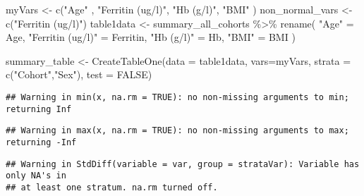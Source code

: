 \documentclass[
]{article}
\newenvironment{Shaded}{\begin{snugshade}}{\end{snugshade}}
\newcommand{\AttributeTok}[1]{\textcolor[rgb]{0.77,0.63,0.00}{#1}}
\newcommand{\ConstantTok}[1]{\textcolor[rgb]{0.00,0.00,0.00}{#1}}
\newcommand{\FunctionTok}[1]{\textcolor[rgb]{0.00,0.00,0.00}{#1}}
\newcommand{\NormalTok}[1]{#1}
\newcommand{\OtherTok}[1]{\textcolor[rgb]{0.56,0.35,0.01}{#1}}
\newcommand{\SpecialCharTok}[1]{\textcolor[rgb]{0.00,0.00,0.00}{#1}}
\newcommand{\StringTok}[1]{\textcolor[rgb]{0.31,0.60,0.02}{#1}}
\begin{document}
\begin{Shaded}
\begin{Highlighting}[]
\NormalTok{myVars }\OtherTok{\textless{}{-}} \FunctionTok{c}\NormalTok{(}\StringTok{"Age"}\NormalTok{ ,}
  \StringTok{"Ferritin (ug/l)"}\NormalTok{,}
  \StringTok{"Hb (g/l)"}\NormalTok{,}
  \StringTok{"BMI"}
\NormalTok{)}
\NormalTok{non\_normal\_vars }\OtherTok{\textless{}{-}} \FunctionTok{c}\NormalTok{(}\StringTok{"Ferritin (ug/l)"}\NormalTok{)}
\NormalTok{table1data }\OtherTok{\textless{}{-}}\NormalTok{ summary\_all\_cohorts  }\SpecialCharTok{\%\textgreater{}\%}
  \FunctionTok{rename}\NormalTok{(}
  \StringTok{"Age"} \OtherTok{=}\NormalTok{ Age,}
  \StringTok{"Ferritin (ug/l)"} \OtherTok{=}\NormalTok{ Ferritin,}
  \StringTok{"Hb (g/l)"} \OtherTok{=}\NormalTok{ Hb,}
  \StringTok{"BMI"} \OtherTok{=}\NormalTok{ BMI}
\NormalTok{)}

\NormalTok{summary\_table }\OtherTok{\textless{}{-}} \FunctionTok{CreateTableOne}\NormalTok{(}\AttributeTok{data =} 
\NormalTok{                                  table1data,}
                                \AttributeTok{vars=}\NormalTok{myVars, }
                                \AttributeTok{strata =} \FunctionTok{c}\NormalTok{(}\StringTok{"Cohort"}\NormalTok{,}\StringTok{"Sex"}\NormalTok{),}
                                \AttributeTok{test =} \ConstantTok{FALSE}\NormalTok{)}
\end{Highlighting}
\end{Shaded}

\begin{verbatim}
## Warning in min(x, na.rm = TRUE): no non-missing arguments to min; returning Inf
\end{verbatim}

\begin{verbatim}
## Warning in max(x, na.rm = TRUE): no non-missing arguments to max; returning -Inf
\end{verbatim}

\begin{verbatim}
## Warning in StdDiff(variable = var, group = strataVar): Variable has only NA's in
## at least one stratum. na.rm turned off.
\end{verbatim}
\end{document}
